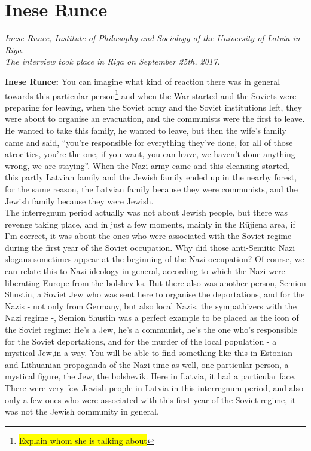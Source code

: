 \section{Inese Runce}

\textit{Inese Runce, Institute of Philosophy and Sociology of the University of Latvia in Riga.\\ 
The interview took place in Riga on September 25th, 2017.}\par
\vspace*{2em}
\textbf{Inese Runce:} You can imagine what kind of reaction there was in general towards this particular person\footnote{\colorbox{yellow}{Explain whom she is talking about}} and when the War started and the Soviets were preparing for leaving, when the Soviet army and the Soviet institutions left, they were about to organise an evacuation, and the communists were the first to leave.  He wanted to take this family, he wanted to leave, but then the wife's family came and said, ``you're responsible for everything they've done, for all of those atrocities, you're the one, if you want, you can leave, we haven't done anything wrong, we are staying''. When the Nazi army came and this cleansing started, this partly Latvian family and the Jewish family ended up in the nearby forest, for the same reason, the Latvian family because they were communists, and the Jewish family because they were Jewish.\\
The interregnum period actually was not about Jewish people, but there was revenge taking place, and in just a few moments, mainly in the Rūjiena area, if I'm correct, it was about the ones who were associated with the Soviet regime during the first year of the Soviet occupation. Why did those anti-Semitic Nazi slogans sometimes appear at the beginning of the Nazi occupation? Of course, we can relate this to Nazi ideology in general, according to which the Nazi were liberating Europe from the bolsheviks. But there also was another person, Semion Shustin, a Soviet Jew who was sent here to organise the  deportations, and for the Nazis - not only from Germany, but also local Nazis, the sympathizers with the Nazi regime -, Semion Shustin was a perfect example to be placed as the icon of the Soviet regime: He's a Jew, he's a communist, he's the one who's responsible for the Soviet deportations, and for the murder of the local population - a mystical Jew,in a way. You will be able to find something like this in Estonian and Lithuanian propaganda of the Nazi time as well, one particular person, a mystical figure, the Jew, the bolshevik. Here in Latvia, it had a particular face. There were very few Jewish people in Latvia in this interregnum period, and also only a few ones who were associated with this first year of the Soviet regime, it was not the Jewish community in general.
	

